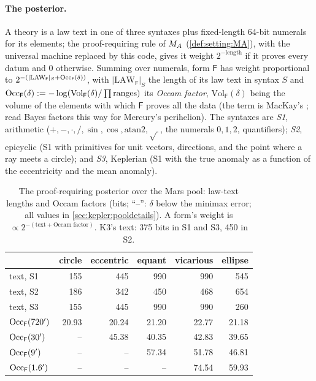 \paragraph{The posterior.} A theory is a law text in one of three syntaxes plus fixed-length 64-bit numerals for its elements; the proof-requiring rule of $M_{A}$ (\cref{def:setting:MA}), with the universal machine replaced by this code, gives it weight $2^{-\text{length}}$ if it proves every datum and $0$ otherwise. Summing over numerals, form $\mathsf F$ has weight proportional to $2^{-(\lvert\mathrm{LAW}_{\mathsf F}\rvert_S+\mathrm{Occ}_{\mathsf F}(\delta))}$, with $\lvert\mathrm{LAW}_{\mathsf F}\rvert_S$ the length of its law text in syntax $S$ and $\mathrm{Occ}_{\mathsf F}(\delta):=-\log(\mathrm{Vol}_{\mathsf F}(\delta)/\prod\text{ranges})$ its \emph{Occam factor}, $\mathrm{Vol}_{\mathsf F}(\delta)$ being the volume of the elements with which $\mathsf F$ proves all the data (the term is MacKay's \citep{mackay1992bayesian}; \citealp{jefferys1992ockham} read Bayes factors this way for Mercury's perihelion). The syntaxes are \emph{S1}, arithmetic ($+,-,\cdot,/,\sin,\cos,\mathrm{atan2},\sqrt{\ }$, the numerals $0,1,2$, quantifiers); \emph{S2}, epicyclic (S1 with primitives for unit vectors, directions, and the point where a ray meets a circle); and \emph{S3}, Keplerian (S1 with the true anomaly as a function of the eccentricity and the mean anomaly).

\begin{table}[t]
\centering\small\crefabbrev
\caption{The proof-requiring posterior over the Mars pool: law-text lengths and Occam factors (bits; ``--'': $\delta$ below the minimax error; all values in \cref{sec:kepler:pooldetails}). A form's weight is $\propto2^{-(\text{text}+\text{Occam factor})}$. $\mathrm{K3}$'s text: 375 bits in S1 and S3, 450 in S2.}\label{tab:kepler:map}
\setlength{\tabcolsep}{4pt}
\begin{tabular}{@{}lrrrrr@{}}
\toprule
& circle & eccentric & equant & vicarious & ellipse\\
\midrule
text, S1 & 155 & 445 & 990 & 990 & 545\\
text, S2 & 186 & 342 & 450 & 468 & 654\\
text, S3 & 155 & 445 & 990 & 990 & 260\\
\midrule
$\mathrm{Occ}_{\mathsf F}(720')$ & 20.93 & 20.24 & 21.20 & 22.77 & 21.18\\
$\mathrm{Occ}_{\mathsf F}(30')$ & -- & 45.38 & 40.35 & 42.83 & 39.65\\
$\mathrm{Occ}_{\mathsf F}(9')$ & -- & -- & 57.34 & 51.78 & 46.81\\
$\mathrm{Occ}_{\mathsf F}(1.6')$ & -- & -- & -- & 74.54 & 59.93\\
\bottomrule
\end{tabular}
\end{table}

